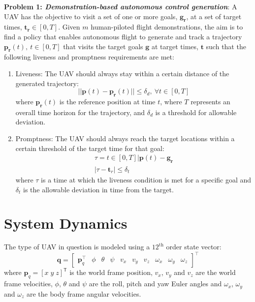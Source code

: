\documentclass[letterpaper, 10 pt, conference]{ieeeconf}  %
\newcommand\NB[1]{$\spadesuit$\footnote{NB: #1}}
\begin{document}
\textbf{Problem 1: \textit{Demonstration-based autonomous control generation}}: A UAV has the objective to visit a set of one or more goals, $\mathbf{g_r}$, at a set of target times, $\mathbf{t_r} \in [0,T]$. Given $m$ human-piloted flight demonstrations, the aim is to find a policy that enables autonomous flight to generate and track a trajectory $\mathbf{p_r}(t),~ t \in [0,T]$ that visits the target goals $\mathbf{g}$ at target times, $\mathbf{t}$ such that the following liveness and promptness requirements are met:
\begin{enumerate}
    \item  Liveness: The UAV should always stay within a certain distance of the generated trajectory:
    \begin{equation}
        ||\mathbf{p}(t)-\mathbf{p_r}(t)|| \leq \delta_d,~\forall t \in [0,T]
    \end{equation}
    where $\mathbf{p_r}(t)$ is the reference position at time $t$, where $T$ represents an overall time horizon for the trajectory, and $\delta_d$ is a threshold for allowable deviation.
    \item  Promptness: The UAV should always reach the target locations within a certain threshold of the target time for that goal:
    \begin{align}
        \tau = t\in[0,T]|\mathbf{p}(t)-\mathbf{g_r} \nonumber \\
        |\tau- \mathbf{t}_r| \leq \delta_t
    \end{align}
    where $\tau$ is a time at which the liveness condition is met for a specific goal and $\delta_t$ is the allowable deviation in time from the target.
\end{enumerate}


\section{System Dynamics}
The type of UAV in question is modeled using a $12^{\text{th}}$ order state vector:
\begin{equation}
    \mathbf{q} = 
    \begin{bmatrix}
    \mathbf{p}_q^\intercal & \phi & \theta & \psi & v_x & v_y & v_z & \omega_x & \omega_y & \omega_z
    \end{bmatrix}^\intercal \nonumber
\end{equation} %
where $\bm{p}_q=[x \; y \; z]^{\mathsf{T}}$ is the world frame position, $v_{x}$, $v_{y}$ and $v_z$ are the world frame velocities, $\phi$, $\theta$ and $\psi$ are the roll, pitch and yaw Euler angles and $\omega_{x}$, $\omega_{y}$ and $\omega_{z}$ are the body frame angular velocities.
\end{document}
